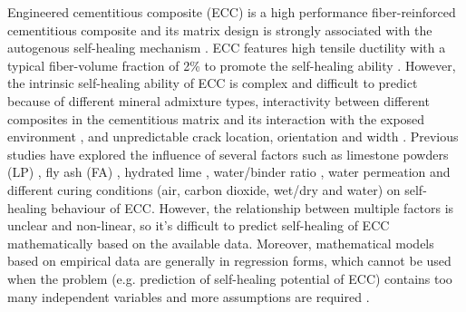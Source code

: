 \documentclass[11pt]{article}
\begin{document}
	
	Engineered cementitious composite (ECC) is a high performance fiber-reinforced cementitious composite and its matrix design is strongly associated with the autogenous self-healing mechanism \cite{kamada2000effects}. ECC features high tensile ductility with a typical fiber-volume fraction of 2\%  \cite{li1998innovations,ozbay2013self} to promote the self-healing ability \cite{tang2015robust}. However, the intrinsic self-healing ability of ECC is complex and difficult to predict because of different mineral admixture types, interactivity between different composites in the cementitious matrix and its interaction with the exposed environment \cite{wu2012review}, and unpredictable crack location, orientation and width \cite{huang2013characterization}. Previous studies have explored the influence of several factors such as limestone powders (LP) \cite{suleiman2019visualization,zhou2008developing}, fly ash (FA) \cite{li2007self,zhang2014investigating}, hydrated lime \cite{yildirim2014influence}, water/binder ratio \cite{yang2005self}, water permeation \cite{sahmaran2007transport} and different curing conditions (air, carbon dioxide, wet/dry and water) \cite{qian2010influence} on self-healing behaviour of ECC. However, the relationship between multiple factors is unclear and non-linear, so it’s difficult to predict self-healing of ECC mathematically based on the available data. Moreover, mathematical models based on empirical data are generally in regression forms, which cannot be used when the problem (e.g. prediction of self-healing potential of ECC) contains too many independent variables and more assumptions are required  \cite{alshihri2009neural}.
	
\end{document}
